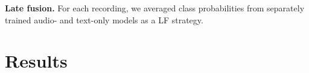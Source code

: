 \documentclass{article}
\begin{document}
{\textbf{Late fusion.} For each recording, we averaged class probabilities from separately trained audio- and text-only models as a LF strategy. 

\section{Results}
\label{sec:pagestyle}







}
\end{document}
